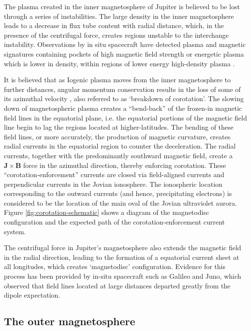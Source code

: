 The plasma created in the inner magnetosphere of Jupiter is believed to be lost through a series of instabilities. The large density in the inner magnetosphere leads to a decrease in flux tube content with radial distance, which, in the presence of the centrifugal force, creates regions unstable to the interchange instability. Observations by in situ spacecraft have detected plasma and magnetic signatures containing pockets of high magnetic field strength or energetic plasma which is lower in density, within regions of lower energy high-density plasma \cite{Thorne1997GalileoTorus,Kivelson1997IntermittentInterchange}. 

It is believed that as Iogenic plasma moves from the inner magnetosphere to further distances, angular momentum conservation results in the loss of some of its azimuthal velocity \cite{Cowley2001a,Hill2001,Southwood2001a}, also referred to as `breakdown of corotation'. The slowing down of magnetospheric plasma creates a ``bend-back'' of the frozen-in magnetic field lines in the equatorial plane, i.e. the equatorial portions of the magnetic field line begin to lag the regions located at higher-latitudes. The bending of these field lines, or more accurately, the production of magnetic curvature, creates radial currents in the equatorial region to counter the deceleration. The radial currents, together with the predominantly southward magnetic field, create a $\mathbf{J}\times\mathbf{B}$ force in the azimuthal direction, thereby enforcing corotation. These ``corotation-enforcement'' currents are closed via field-aligned currents and perpendicular currents in the Jovian ionosphere. The ionospheric location corresponding to the outward currents (and hence, precipitating electrons) is considered to be the location of the main oval of the Jovian ultraviolet aurora. Figure \ref{fig:corotation-schematic} shows a diagram of the magnetodisc configuration and the expected path of the corotation-enforcement current system.

The centrifugal force in Jupiter's magnetosphere also extends the magnetic field in the radial direction, leading to the formation of a equatorial current sheet at all longitudes, which creates `magnetodisc' configuration. Evidence for this process has been provided by in-situ spacecraft such as Galileo and Juno, which observed that field lines located at large distances departed greatly from the dipole expectation. 

\subsection{The outer magnetosphere}

